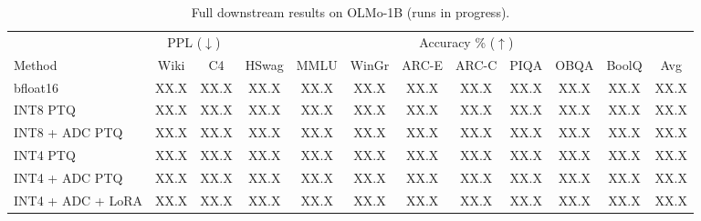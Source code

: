 \documentclass[letterpaper]{article} %
\theoremstyle{plain}
\newcommand{\phnum}{XX.X}
\begin{document}
\begin{table}[t]
\centering
\setlength{\tabcolsep}{4pt}
\begin{tabular}{l|cc|ccccccccc}
\toprule
 & \multicolumn{2}{c|}{PPL ($\downarrow$)} & \multicolumn{9}{c}{Accuracy \% ($\uparrow$)} \\
Method & Wiki & C4 & HSwag & MMLU & WinGr & ARC-E & ARC-C & PIQA & OBQA & BoolQ & Avg \\
\midrule
bfloat16          & \phnum & \phnum & \phnum & \phnum & \phnum & \phnum & \phnum & \phnum & \phnum & \phnum & \phnum \\ %
INT8 PTQ          & \phnum & \phnum & \phnum & \phnum & \phnum & \phnum & \phnum & \phnum & \phnum & \phnum & \phnum \\ %
INT8 + ADC PTQ    & \phnum & \phnum & \phnum & \phnum & \phnum & \phnum & \phnum & \phnum & \phnum & \phnum & \phnum \\ %
INT4 PTQ          & \phnum & \phnum & \phnum & \phnum & \phnum & \phnum & \phnum & \phnum & \phnum & \phnum & \phnum \\ %
INT4 + ADC PTQ    & \phnum & \phnum & \phnum & \phnum & \phnum & \phnum & \phnum & \phnum & \phnum & \phnum & \phnum \\ %
INT4 + ADC + LoRA & \phnum & \phnum & \phnum & \phnum & \phnum & \phnum & \phnum & \phnum & \phnum & \phnum & \phnum \\ %
\bottomrule
\end{tabular}
\caption{Full downstream results on OLMo-1B (runs in progress).}
\label{tab:downstream_olmo}
\end{table}
\end{document}
